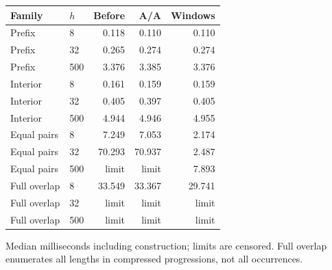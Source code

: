 \begin{center}\small
\begin{tabular}{@{}llrrr@{}}
\toprule
Family & $h$ & Before & A/A & Windows \\
\midrule
Prefix & 8 & 0.118 & 0.110 & 0.110 \\
Prefix & 32 & 0.265 & 0.274 & 0.274 \\
Prefix & 500 & 3.376 & 3.385 & 3.376 \\
Interior & 8 & 0.161 & 0.159 & 0.159 \\
Interior & 32 & 0.405 & 0.397 & 0.405 \\
Interior & 500 & 4.944 & 4.946 & 4.955 \\
Equal pairs & 8 & 7.249 & 7.053 & 2.174 \\
Equal pairs & 32 & 70.293 & 70.937 & 2.487 \\
Equal pairs & 500 & limit & limit & 7.893 \\
Full overlap & 8 & 33.549 & 33.367 & 29.741 \\
Full overlap & 32 & limit & limit & limit \\
Full overlap & 500 & limit & limit & limit \\
\bottomrule
\end{tabular}
\end{center}
Median milliseconds including construction; limits are censored. Full overlap enumerates all lengths in compressed progressions, not all occurrences.
